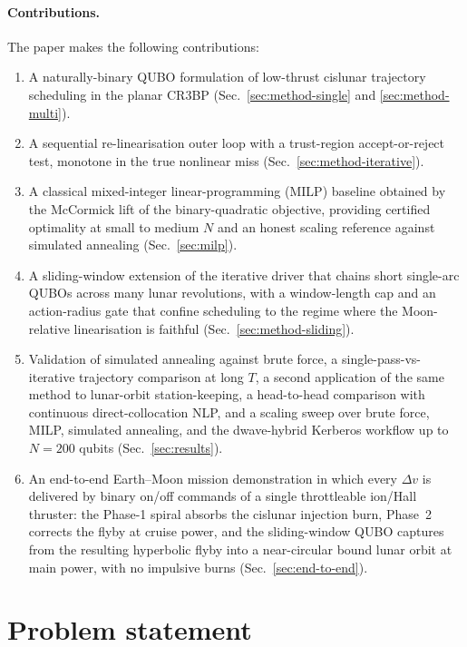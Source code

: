 \documentclass[11pt,a4paper]{article}
\theoremstyle{plain}
\begin{document}
\paragraph{Contributions.} The paper makes the following
contributions:
\begin{enumerate}[leftmargin=1.5em, itemsep=2pt]
  \item A naturally-binary QUBO formulation of low-thrust cislunar
    trajectory scheduling in the planar CR3BP (Sec.~\ref{sec:method-single} and \ref{sec:method-multi}).
  \item A sequential re-linearisation outer loop with a
    trust-region accept-or-reject test, monotone in the true
    nonlinear miss (Sec.~\ref{sec:method-iterative}).
  \item A classical mixed-integer linear-programming (MILP) baseline
    obtained by the McCormick lift of the binary-quadratic
    objective, providing certified optimality at small to medium
    $N$ and an honest scaling reference against simulated annealing
    (Sec.~\ref{sec:milp}).
  \item A sliding-window extension of the iterative driver that
    chains short single-arc QUBOs across many lunar revolutions,
    with a window-length cap and an action-radius gate that
    confine scheduling to the regime where the Moon-relative
    linearisation is faithful
    (Sec.~\ref{sec:method-sliding}).
  \item Validation of simulated annealing against brute force,
    a single-pass-vs-iterative trajectory comparison at long $T$,
    a second application of the same method to lunar-orbit
    station-keeping, a head-to-head comparison with continuous
    direct-collocation NLP, and a scaling sweep over brute force,
    MILP, simulated annealing, and the dwave-hybrid Kerberos
    workflow up to $N = 200$ qubits (Sec.~\ref{sec:results}).
  \item An end-to-end Earth--Moon mission demonstration in which
    every $\Delta v$ is delivered by binary on/off commands of a
    single throttleable ion/Hall thruster: the Phase-1 spiral
    absorbs the cislunar injection burn, Phase~2 corrects the
    flyby at cruise power, and the sliding-window QUBO captures
    from the resulting hyperbolic flyby into a near-circular
    bound lunar orbit at main power, with no impulsive burns
    (Sec.~\ref{sec:end-to-end}).
\end{enumerate}

\section{Problem statement}\label{sec:problem}
\end{document}
